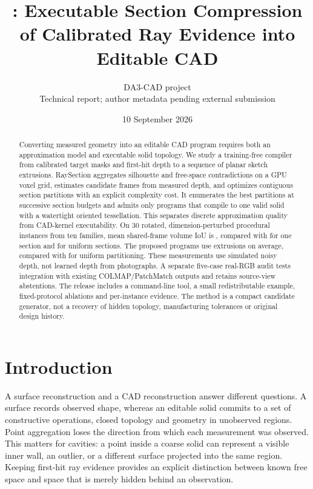 \documentclass[10pt]{article}
\title{\method: Executable Section Compression of Calibrated Ray Evidence into Editable CAD}
\author{DA3-CAD project\\\small Technical report; author metadata pending external submission}
\date{10 September 2026}
\newcommand{\method}{RaySection}
\begin{document}
\maketitle

\begin{abstract}
Converting measured geometry into an editable CAD program requires both an
approximation model and executable solid topology. We study a training-free
compiler from calibrated target masks and first-hit depth to a sequence of
planar sketch extrusions. \method{} aggregates silhouette and free-space
contradictions on a GPU voxel grid, estimates candidate frames from measured
depth, and optimizes contiguous section partitions with an explicit complexity
cost. It enumerates the best partitions at successive section budgets and
admits only programs that compile to one valid solid with a watertight oriented
tessellation. This separates discrete approximation quality from CAD-kernel
executability. On 30 rotated, dimension-perturbed procedural instances from ten
families, mean shared-frame volume IoU is \OursIoU{}, compared with
\SingleIoU{} for one section and \UniformIoU{} for uniform sections.
The proposed programs use \OursExtrusions{} extrusions on average, compared with
\UniformExtrusions{} for uniform partitioning. These measurements use simulated
noisy depth, not learned depth from photographs. A separate five-case real-RGB
audit tests integration with existing COLMAP/PatchMatch outputs and retains
source-view abstentions. The release includes a command-line tool, a small
redistributable example, fixed-protocol ablations and per-instance evidence.
The method is a compact candidate generator, not a recovery of hidden topology,
manufacturing tolerances or original design history.
\end{abstract}

\section{Introduction}
A surface reconstruction and a CAD reconstruction answer different questions.
A surface records observed shape, whereas an editable solid commits to a set
of constructive operations, closed topology and geometry in unobserved regions.
Point aggregation loses the direction from which each measurement was observed.
This matters for cavities: a point inside a coarse solid can represent a visible
inner wall, an outlier, or a different surface projected into the same region.
Keeping first-hit ray evidence provides an explicit distinction between known
free space and space that is merely hidden behind an observation.
\end{document}
